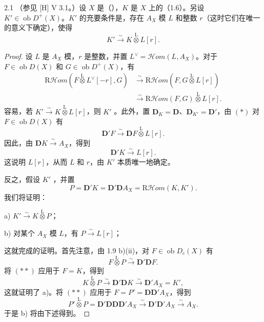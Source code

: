 \begin{SGAresult}{}{2.1}
（参见 [H] V 3.1。）设 $X$ 是（），$K$ 是 $X$ 上的（1.6）。另设 $K'\in\operatorname{ob}D^+(X)$。$K'$ 的充要条件是，存在 $A_X$ 模 $L$ 和整数 $r$（这时它们在唯一的意义下确定），使得
\[
 K'\xrightarrow{\sim}K\mathbin{\overset{\mathrm L}{\otimes}}L[r].
\]
\end{SGAresult}
\begin{proof}
设 $L$ 是 $A_X$ 模，$r$ 是整数，并置 $L^\vee=\mathcal Hom(L,A_X)$。对于 $F\in\operatorname{ob}D(X)$ 和 $G\in\operatorname{ob}D^+(X)$，有
\[
 \begin{aligned}
 \mathrm R\mathcal Hom(F\mathbin{\overset{\mathrm L}{\otimes}}L^\vee[-r],G)
 &\xrightarrow{\sim}\mathrm R\mathcal Hom(F,G\mathbin{\overset{\mathrm L}{\otimes}}L[r])\\
 &\xrightarrow{\sim}\mathrm R\mathcal Hom(F,G)\mathbin{\overset{\mathrm L}{\otimes}}L[r].
 \end{aligned}\tag{*}
\]
容易，若 $K'\xrightarrow{\sim}K\mathbin{\overset{\mathrm L}{\otimes}}L[r]$，则 $K'$ 。此外，置 $\mathbf D_K=\mathbf D$、$\mathbf D_{K'}=\mathbf D'$，由 $(*)$ 对 $F\in\operatorname{ob}D(X)$ 有
\[
 \mathbf D'F\xrightarrow{\sim}\mathbf DF\mathbin{\overset{\mathrm L}{\otimes}}L[r].
\]
因此，由 $\mathbf DK\xrightarrow{\sim}A_X$，得到
\[
 \mathbf D'K\xrightarrow{\sim}L[r].
\]
这说明 $L[r]$，从而 $L$ 和 $r$，由 $K'$ 本质唯一地确定。

反之，假设 $K'$ ，并置
\[
 P=\mathbf D'K=\mathbf D'\mathbf DA_X=\mathrm R\mathcal Hom(K,K').
\]
我们将证明：

 a) $K'\xrightarrow{\sim}K\mathbin{\overset{\mathrm L}{\otimes}}P$；

 b) 对某个 $A_X$ 模 $L$，有 $P\xrightarrow{\sim}L[r]$；

这就完成的证明。首先注意，由 1.9 b)(ii)，对 $F\in\operatorname{ob}D_c(X)$ 有
\[
 F\mathbin{\overset{\mathrm L}{\otimes}}P\xrightarrow{\sim}\mathbf D'\mathbf DF.\tag{**}
\]
将 $(**)$ 应用于 $F=K$，得到
\[
 K\mathbin{\overset{\mathrm L}{\otimes}}P\xrightarrow{\sim}\mathbf D'\mathbf DK
 \xrightarrow{\sim}\mathbf D'A_X=K',
\]
这就证明了 a)。将 $(**)$ 应用于 $F=P'=\mathbf D\mathbf D'A_X$，得到
\[
 P'\mathbin{\overset{\mathrm L}{\otimes}}P
 =\mathbf D'\mathbf D\mathbf D\mathbf D'A_X
 \xrightarrow{\sim}\mathbf D'\mathbf D'A_X\xrightarrow{\sim}A_X.
\]
于是 b) 将由下述得到。
\end{proof}
